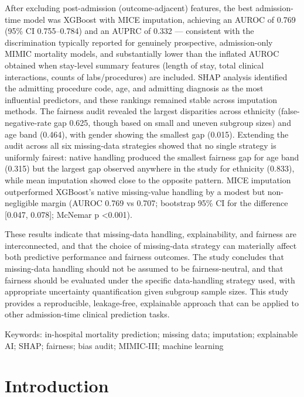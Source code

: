 \documentclass[12pt,a4paper]{report}
\begin{document}
After excluding post-admission (outcome-adjacent) features, the best admission-time model was XGBoost with MICE imputation, achieving an AUROC of 0.769 (95\% CI 0.755--0.784) and an AUPRC of 0.332 --- consistent with the discrimination typically reported for genuinely prospective, admission-only MIMIC mortality models, and substantially lower than the inflated AUROC obtained when stay-level summary features (length of stay, total clinical interactions, counts of labs/procedures) are included. SHAP analysis identified the admitting procedure code, age, and admitting diagnosis as the most influential predictors, and these rankings remained stable across imputation methods. The fairness audit revealed the largest disparities across ethnicity (false-negative-rate gap 0.625, though based on small and uneven subgroup sizes) and age band (0.464), with gender showing the smallest gap (0.015). Extending the audit across all six missing-data strategies showed that no single strategy is uniformly fairest: native handling produced the smallest fairness gap for age band (0.315) but the largest gap observed anywhere in the study for ethnicity (0.833), while mean imputation showed close to the opposite pattern. MICE imputation outperformed XGBoost's native missing-value handling by a modest but non-negligible margin (AUROC 0.769 vs 0.707; bootstrap 95\% CI for the difference [0.047, 0.078]; McNemar p \textless 0.001).

These results indicate that missing-data handling, explainability, and fairness are interconnected, and that the choice of missing-data strategy can materially affect both predictive performance and fairness outcomes. The study concludes that missing-data handling should not be assumed to be fairness-neutral, and that fairness should be evaluated under the specific data-handling strategy used, with appropriate uncertainty quantification given subgroup sample sizes. This study provides a reproducible, leakage-free, explainable approach that can be applied to other admission-time clinical prediction tasks.

Keywords: in-hospital mortality prediction; missing data; imputation; explainable AI; SHAP; fairness; bias audit; MIMIC-III; machine learning


\chapter{Introduction}
\end{document}
